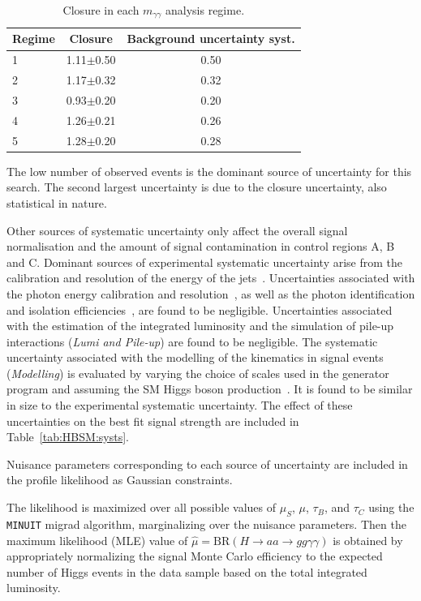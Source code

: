 \begin{table}[htbp]
  \begin{center}
    \caption{Closure in each $m_{\gamma\gamma}$ analysis regime.}
  \label{tab:HBSM:closure_uncertainty}
    {\footnotesize
  \begin{tabular}{ l c c }
    \toprule
    Regime & Closure & Background uncertainty syst. \\
    \midrule
    1 & 1.11$\pm$0.50 & 0.50 \\
    2 & 1.17$\pm$0.32 & 0.32 \\
    3 & 0.93$\pm$0.20 & 0.20 \\
    4 & 1.26$\pm$0.21 & 0.26 \\
    5 & 1.28$\pm$0.20 & 0.28 \\
    \bottomrule
  \end{tabular}
    }
  \end{center}
\end{table}

The low number of observed events is the dominant source of uncertainty for this search.
The second largest uncertainty is due to the closure uncertainty, also statistical in nature.

Other sources of systematic uncertainty only affect the overall signal normalisation and the amount of signal contamination
in control regions A, B and C.
Dominant sources of experimental systematic uncertainty arise from the calibration and resolution of the energy of the 
jets~\cite{PERF-2016-04,PERF-2011-04}. 
Uncertainties associated with the photon energy calibration and resolution~\cite{PERF-2013-05}, as well as the photon identification and isolation
efficiencies~\cite{PERF-2013-04}, are found to be negligible. Uncertainties associated 
with the estimation of the integrated luminosity and the simulation of pile-up interactions (\textit{Lumi and Pile-up})
are found to be negligible. 
The systematic uncertainty associated with the modelling of the kinematics in signal 
events (\textit{Modelling}) is evaluated by varying the choice of scales used in the generator program and
assuming the SM Higgs boson production~\cite{Heinemeyer:2013tqa}.
It is found to be similar in size to the experimental systematic uncertainty.
The effect of these uncertainties on the best fit signal strength are included in Table~\ref{tab:HBSM:systs}.

Nuisance parameters corresponding to each source of uncertainty are included in the profile likelihood as Gaussian constraints.

The likelihood is maximized over all possible values of $\mu_S$, $\mu$, $\tau_B$, and $\tau_C$ using the \texttt{MINUIT} migrad algorithm, marginalizing over the nuisance parameters.
Then the maximum likelihood (MLE) value of $\hat{\mu} = \text{BR}(H\rightarrow aa\rightarrow gg\gamma\gamma)$ is obtained by appropriately 
normalizing the signal Monte Carlo efficiency to the expected number of Higgs events in the data sample based on the total integrated luminosity.

